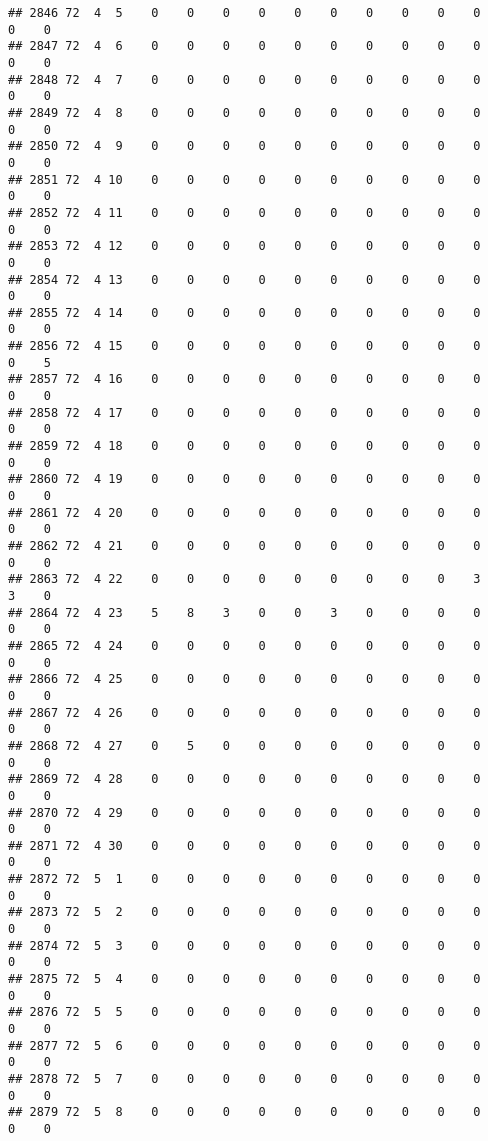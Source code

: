 \documentclass[]{article}
\begin{document}
\begin{verbatim}
## 2846 72  4  5    0    0    0    0    0    0    0    0    0    0    0    0
## 2847 72  4  6    0    0    0    0    0    0    0    0    0    0    0    0
## 2848 72  4  7    0    0    0    0    0    0    0    0    0    0    0    0
## 2849 72  4  8    0    0    0    0    0    0    0    0    0    0    0    0
## 2850 72  4  9    0    0    0    0    0    0    0    0    0    0    0    0
## 2851 72  4 10    0    0    0    0    0    0    0    0    0    0    0    0
## 2852 72  4 11    0    0    0    0    0    0    0    0    0    0    0    0
## 2853 72  4 12    0    0    0    0    0    0    0    0    0    0    0    0
## 2854 72  4 13    0    0    0    0    0    0    0    0    0    0    0    0
## 2855 72  4 14    0    0    0    0    0    0    0    0    0    0    0    0
## 2856 72  4 15    0    0    0    0    0    0    0    0    0    0    0    5
## 2857 72  4 16    0    0    0    0    0    0    0    0    0    0    0    0
## 2858 72  4 17    0    0    0    0    0    0    0    0    0    0    0    0
## 2859 72  4 18    0    0    0    0    0    0    0    0    0    0    0    0
## 2860 72  4 19    0    0    0    0    0    0    0    0    0    0    0    0
## 2861 72  4 20    0    0    0    0    0    0    0    0    0    0    0    0
## 2862 72  4 21    0    0    0    0    0    0    0    0    0    0    0    0
## 2863 72  4 22    0    0    0    0    0    0    0    0    0    3    3    0
## 2864 72  4 23    5    8    3    0    0    3    0    0    0    0    0    0
## 2865 72  4 24    0    0    0    0    0    0    0    0    0    0    0    0
## 2866 72  4 25    0    0    0    0    0    0    0    0    0    0    0    0
## 2867 72  4 26    0    0    0    0    0    0    0    0    0    0    0    0
## 2868 72  4 27    0    5    0    0    0    0    0    0    0    0    0    0
## 2869 72  4 28    0    0    0    0    0    0    0    0    0    0    0    0
## 2870 72  4 29    0    0    0    0    0    0    0    0    0    0    0    0
## 2871 72  4 30    0    0    0    0    0    0    0    0    0    0    0    0
## 2872 72  5  1    0    0    0    0    0    0    0    0    0    0    0    0
## 2873 72  5  2    0    0    0    0    0    0    0    0    0    0    0    0
## 2874 72  5  3    0    0    0    0    0    0    0    0    0    0    0    0
## 2875 72  5  4    0    0    0    0    0    0    0    0    0    0    0    0
## 2876 72  5  5    0    0    0    0    0    0    0    0    0    0    0    0
## 2877 72  5  6    0    0    0    0    0    0    0    0    0    0    0    0
## 2878 72  5  7    0    0    0    0    0    0    0    0    0    0    0    0
## 2879 72  5  8    0    0    0    0    0    0    0    0    0    0    0    0

\end{verbatim}
\end{document}
